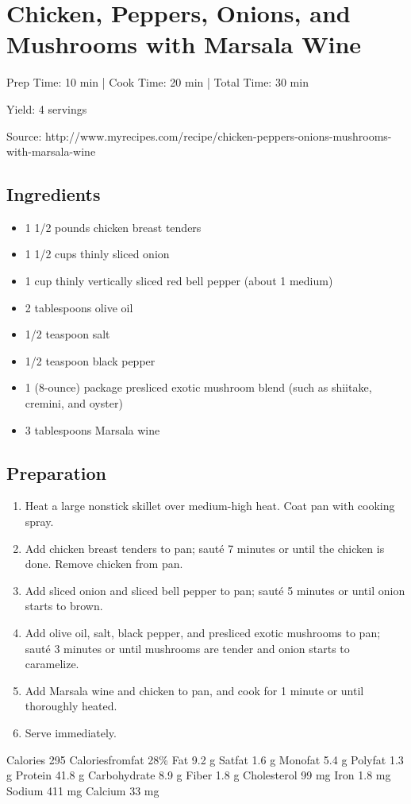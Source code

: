 \section{Chicken, Peppers, Onions, and Mushrooms with Marsala Wine}

\begin{center}
Prep Time: 10 min | 
Cook Time: 20 min | 
Total Time: 30 min

\noindent Yield: 4 servings

\vspace{1em}

Source: http://www.myrecipes.com/recipe/chicken-peppers-onions-mushrooms-with-marsala-wine
\end{center}

\subsection{Ingredients}
\begin{multicols}{2}
\begin{itemize}
    \item 1 1/2 pounds chicken breast tenders
    \item 1 1/2 cups thinly sliced onion
    \item 1 cup thinly vertically sliced red bell pepper (about 1 medium)
    \item 2 tablespoons olive oil
    \item 1/2 teaspoon salt
    \item 1/2 teaspoon black pepper
    \item 1 (8-ounce) package presliced exotic mushroom blend (such as shiitake, cremini, and oyster)
    \item 3 tablespoons Marsala wine
\end{itemize}
\end{multicols}

\subsection{Preparation}
\begin{enumerate}
    \item Heat a large nonstick skillet over medium-high heat. Coat pan with cooking spray.
    \item Add chicken breast tenders to pan; sauté 7 minutes or until the chicken is done. Remove chicken from pan.
    \item Add sliced onion and sliced bell pepper to pan; sauté 5 minutes or until onion starts to brown.
    \item Add olive oil, salt, black pepper, and presliced exotic mushrooms to pan; saut\'{e} 3 minutes or until mushrooms are tender and onion starts to caramelize.
    \item Add Marsala wine and chicken to pan, and cook for 1 minute or until thoroughly heated.
    \item Serve immediately.
\end{enumerate}

Calories 295  Caloriesfromfat 28\%  Fat 9.2 g  Satfat 1.6 g  Monofat 5.4 g  Polyfat 1.3 g  Protein 41.8 g  Carbohydrate 8.9 g  Fiber 1.8 g  Cholesterol 99 mg  Iron 1.8 mg  Sodium 411 mg  Calcium 33 mg
